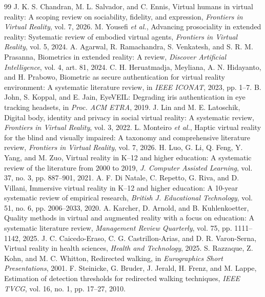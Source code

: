 \begin{thebibliography}{99}
 J. K. S. Chandran, M. L. Salvador, and C. Ennis, Virtual humans in virtual reality: A scoping review on sociability, fidelity, and expression, \emph{Frontiers in Virtual Reality}, vol. 7, 2026.
 M. Yousefi \emph{et al.}, Advancing prosociality in extended reality: Systematic review of embodied virtual agents, \emph{Frontiers in Virtual Reality}, vol. 5, 2024.
 A. Agarwal, R. Ramachandra, S. Venkatesh, and S. R. M. Prasanna, Biometrics in extended reality: A review, \emph{Discover Artificial Intelligence}, vol. 4, art. 81, 2024.
 C. H. Heruatmadja, Meyliana, A. N. Hidayanto, and H. Prabowo, Biometric as secure authentication for virtual reality environment: A systematic literature review, in \emph{IEEE ICONAT}, 2023, pp. 1--7.
 B. John, S. Koppal, and E. Jain, EyeVEIL: Degrading iris authentication in eye tracking headsets, in \emph{Proc. ACM ETRA}, 2019.
 J. Lin and M. E. Latoschik, Digital body, identity and privacy in social virtual reality: A systematic review, \emph{Frontiers in Virtual Reality}, vol. 3, 2022.
 L. Monteiro \emph{et al.}, Haptic virtual reality for the blind and visually impaired: A taxonomy and comprehensive literature review, \emph{Frontiers in Virtual Reality}, vol. 7, 2026.
 H. Luo, G. Li, Q. Feng, Y. Yang, and M. Zuo, Virtual reality in K--12 and higher education: A systematic review of the literature from 2000 to 2019, \emph{J. Computer Assisted Learning}, vol. 37, no. 3, pp. 887--901, 2021.
 A. F. Di Natale, C. Repetto, G. Riva, and D. Villani, Immersive virtual reality in K--12 and higher education: A 10-year systematic review of empirical research, \emph{British J. Educational Technology}, vol. 51, no. 6, pp. 2006--2033, 2020.
 A. Karcher, D. Arnold, and B. Kuhlenkoetter, Quality methods in virtual and augmented reality with a focus on education: A systematic literature review, \emph{Management Review Quarterly}, vol. 75, pp. 1111--1142, 2025.
 J. C. Caicedo-Eraso, C. G. Castrillon-Arias, and D. R. Varon-Serna, Virtual reality in health sciences, \emph{Health and Technology}, 2025.
 S. Razzaque, Z. Kohn, and M. C. Whitton, Redirected walking, in \emph{Eurographics Short Presentations}, 2001.
 F. Steinicke, G. Bruder, J. Jerald, H. Frenz, and M. Lappe, Estimation of detection thresholds for redirected walking techniques, \emph{IEEE TVCG}, vol. 16, no. 1, pp. 17--27, 2010.

\end{thebibliography}
